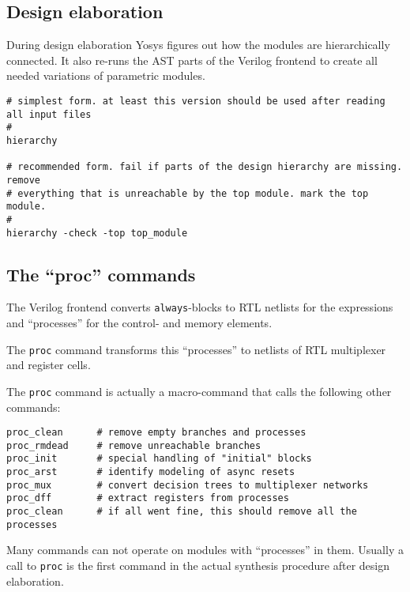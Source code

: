 
\subsection{Design elaboration}

\begin{frame}[fragile]{\subsecname}
During design elaboration Yosys figures out how the modules are hierarchically
connected. It also re-runs the AST parts of the Verilog frontend to create
all needed variations of parametric modules.

\bigskip
\begin{lstlisting}[xleftmargin=0.5cm, basicstyle=\ttfamily\fontsize{8pt}{10pt}\selectfont]
# simplest form. at least this version should be used after reading all input files
#
hierarchy

# recommended form. fail if parts of the design hierarchy are missing. remove
# everything that is unreachable by the top module. mark the top module.
#
hierarchy -check -top top_module
\end{lstlisting}
\end{frame}


\subsection{The ``proc'' commands}

\begin{frame}[fragile]{\subsecname}
The Verilog frontend converts {\tt always}-blocks to RTL netlists for the
expressions and ``processes'' for the control- and memory elements.

\medskip
The {\tt proc} command transforms this ``processes'' to netlists of RTL
multiplexer and register cells.

\medskip
The {\tt proc} command is actually a macro-command that calls the following
other commands:

\begin{lstlisting}[xleftmargin=0.5cm, basicstyle=\ttfamily\fontsize{8pt}{10pt}\selectfont]
proc_clean      # remove empty branches and processes
proc_rmdead     # remove unreachable branches
proc_init       # special handling of "initial" blocks
proc_arst       # identify modeling of async resets
proc_mux        # convert decision trees to multiplexer networks
proc_dff        # extract registers from processes
proc_clean      # if all went fine, this should remove all the processes
\end{lstlisting}

\medskip
Many commands can not operate on modules with ``processes'' in them. Usually
a call to {\tt proc} is the first command in the actual synthesis procedure
after design elaboration.

\end{frame}

